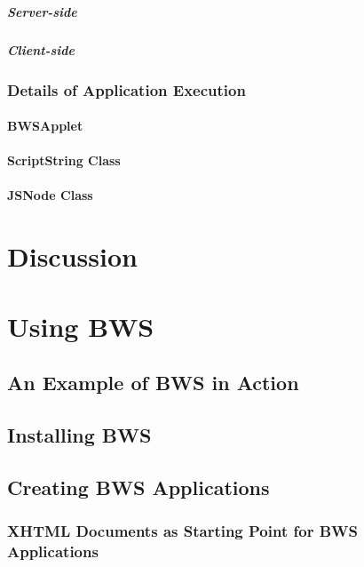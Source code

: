     \paragraph{Server-side}
    \paragraph{Client-side}
   \subsection{Details of Application Execution}
    \subsubsection{BWSApplet}
    \subsubsection{ScriptString Class}
    \subsubsection{JSNode Class}
    
     
    
\chapter{Discussion}

\chapter{Using BWS}

 \section{An Example of BWS in Action}
 \section{Installing BWS}
 \section{Creating BWS Applications}
 \label{sec:CreatingBWSApplications}
 
  \subsection{XHTML Documents as Starting Point for BWS Applications}
  \label{sec:XHTMLDocumentsAsStartingPoint}

